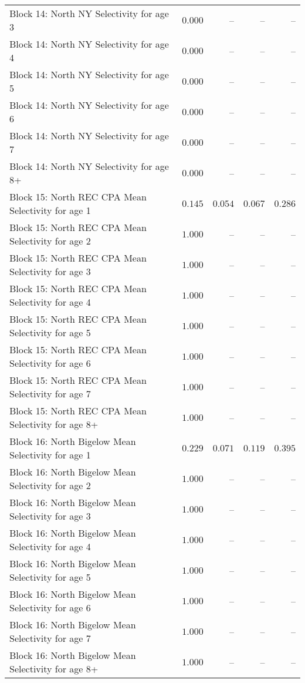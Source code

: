 \documentclass[
]{article}
\begin{document}
\begin{landscape}
\begin{longtable}[t]{lrrrr}
Block 14: North NY Selectivity for age 3 & $0.000$ & -- & -- & --\\
\addlinespace
Block 14: North NY Selectivity for age 4 & $0.000$ & -- & -- & --\\
Block 14: North NY Selectivity for age 5 & $0.000$ & -- & -- & --\\
Block 14: North NY Selectivity for age 6 & $0.000$ & -- & -- & --\\
Block 14: North NY Selectivity for age 7 & $0.000$ & -- & -- & --\\
Block 14: North NY Selectivity for age 8+ & $0.000$ & -- & -- & --\\
\addlinespace
Block 15: North REC CPA Mean Selectivity for age 1 & $0.145$ & $0.054$ & $0.067$ & $0.286$\\
Block 15: North REC CPA Mean Selectivity for age 2 & $1.000$ & -- & -- & --\\
Block 15: North REC CPA Mean Selectivity for age 3 & $1.000$ & -- & -- & --\\
Block 15: North REC CPA Mean Selectivity for age 4 & $1.000$ & -- & -- & --\\
Block 15: North REC CPA Mean Selectivity for age 5 & $1.000$ & -- & -- & --\\
\addlinespace
Block 15: North REC CPA Mean Selectivity for age 6 & $1.000$ & -- & -- & --\\
Block 15: North REC CPA Mean Selectivity for age 7 & $1.000$ & -- & -- & --\\
Block 15: North REC CPA Mean Selectivity for age 8+ & $1.000$ & -- & -- & --\\
Block 16: North Bigelow Mean Selectivity for age 1 & $0.229$ & $0.071$ & $0.119$ & $0.395$\\
Block 16: North Bigelow Mean Selectivity for age 2 & $1.000$ & -- & -- & --\\
\addlinespace
Block 16: North Bigelow Mean Selectivity for age 3 & $1.000$ & -- & -- & --\\
Block 16: North Bigelow Mean Selectivity for age 4 & $1.000$ & -- & -- & --\\
Block 16: North Bigelow Mean Selectivity for age 5 & $1.000$ & -- & -- & --\\
Block 16: North Bigelow Mean Selectivity for age 6 & $1.000$ & -- & -- & --\\
Block 16: North Bigelow Mean Selectivity for age 7 & $1.000$ & -- & -- & --\\
\addlinespace
Block 16: North Bigelow Mean Selectivity for age 8+ & $1.000$ & -- & -- & --\\

\end{longtable}
\end{landscape}
\end{document}

